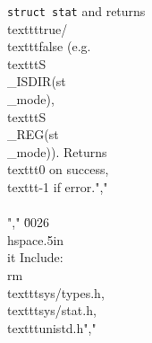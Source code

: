 \texttt{struct stat} and returns \\texttt{true}/\\texttt{false} (e.g. \\texttt{S\\_ISDIR(st\\_mode)}, \\texttt{S\\_REG(st\\_mode)}). Returns \\texttt{0} on success, \\texttt{-1} if error.","        \\\\","    \u0026 \\hspace{.5in}\\it Include: \\rm\\texttt{sys/types.h}, \\texttt{sys/stat.h}, \\texttt{unistd.h}","        %